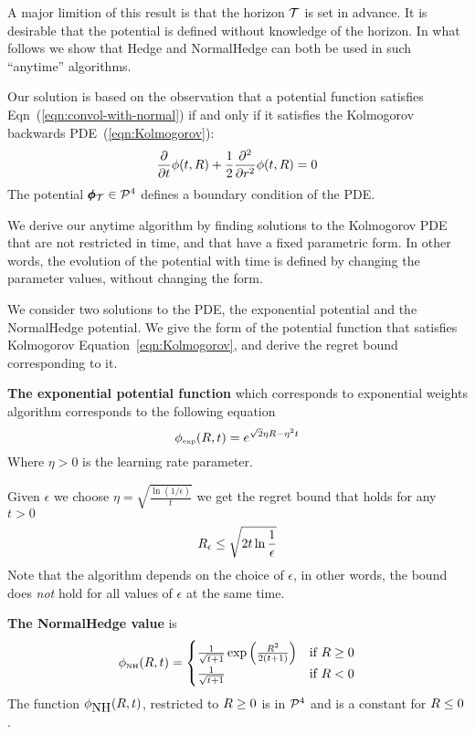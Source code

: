 \documentclass{article}[12pt]
\begin{document}
A major limition of this result is that the horizon $\mathcal{T}$ is set in
advance.  It is desirable that the potential is defined without
knowledge of the horizon.  In what follows we show that Hedge and
NormalHedge can both be used in such ``anytime'' algorithms.

Our solution is based on the observation that a potential function satisfies Eqn~(\ref{eqn:convol-with-normal}) if and only if it satisfies 
the Kolmogorov backwards PDE~(\ref{eqn:Kolmogorov}):
\begin{equation} 
  \frac{\partial}{\partial t} \phi(t,R)
  + \frac{1}{2} \frac{\partial^2}{\partial r^2} \phi(t,R)=0
\end{equation}
The potential $\pmb{\phi}_{\mathcal{T}} \in {\cal P}^{4}$ defines a boundary condition of the PDE.

We derive our anytime algorithm by finding solutions to the Kolmogorov
PDE that are not restricted in time, and that have a fixed parametric form.
In other words, the evolution of the potential with time is defined by changing the parameter values, without changing the form.

We consider two solutions to the PDE, the exponential potential and
the NormalHedge potential. We give the form of the potential function
that satisfies Kolmogorov Equation~\ref{eqn:Kolmogorov}, and derive
the regret bound corresponding to it.

{\bf The exponential potential function} which corresponds to exponential
  weights algorithm corresponds to the following equation
\[
    \phi_{\mbox{\tiny exp}}(R,t) = e^{\sqrt{2} \eta R - \eta^2 t}
  \]
  Where $\eta>0$ is the learning rate parameter.
  
Given $\epsilon$ we choose $\eta = \sqrt{\frac{\ln (1/\epsilon)}{t}}$
we get the regret bound that holds for any $t>0$
  \begin{equation}
    R_\epsilon \leq \sqrt{2 t \ln \frac{1}{\epsilon}}
  \end{equation}
Note that the algorithm depends on the choice of $\epsilon$, in other
words, the bound does {\em not} hold for all values of $\epsilon$ at
the same time.

{\bf The NormalHedge value} is
\begin{equation} \label{eqn:NormalHedge}
  \phi_{\mbox{\tiny NH}}(R,t) = \begin{cases}
    \frac{1}{\sqrt{t+1}}\exp\left(\frac{R^2}{2(t+1)}\right)
    & \mbox{if } R \geq 0  \\
  \frac{1}{\sqrt{t+1}} & \mbox{if } R <0
  \end{cases}
\end{equation}
The function $\phi_{\mbox{NH}}(R,t)$,
restricted to $R\geq 0$ is in ${\cal P}^{4}$ and is a constant for $R \leq 0$.
\end{document}

